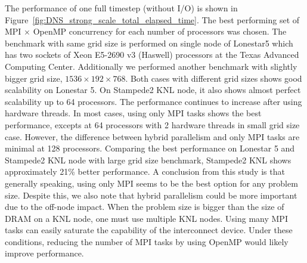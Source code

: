 The performance of one full timestep (without I/O) is shown in
Figure~\ref{fig:DNS_strong_scale_total_elapsed_time}. The best
performing set of MPI $\times$ OpenMP concurrency for each number of
processors was chosen. The benchmark with same grid size is performed
on single node of Lonestar5 which has two sockets of Xeon E5-2690 v3
(Haswell) processors at the Texas Advanced Computing
Center. Additionally we performed another benchmark with slightly
bigger grid size, $1536 \times 192 \times 768$. Both cases with
different grid sizes shows good scalability on Lonestar 5. On
Stampede2 KNL node, it also shows almost perfect scalability up to 64
processors. The performance continues to increase after using hardware
threads. In most cases, using only MPI tasks shows the best
performance, excepts at 64 processors with 2 hardware threads in small
grid size case. However, the difference between hybrid parallelism and
only MPI tasks are minimal at 128 processors. Comparing the best
performance on Lonestar 5 and Stampede2 KNL node with large grid size
benchmark, Stampede2 KNL shows approximately 21\% better
performance. A conclusion from this study is that generally speaking,
using only MPI seems to be the best option for any problem size.
Despite this, we also note that hybrid parallelism could be more
important due to the off-node impact. When the problem size is bigger
than the size of DRAM on a KNL node, one must use multiple KNL
nodes. Using many MPI tasks can easily saturate the capability of the
interconnect device. Under these conditions, reducing the number of
MPI tasks by using OpenMP would likely improve performance.

